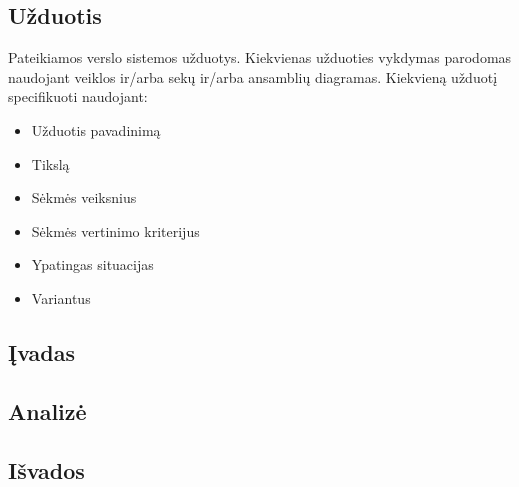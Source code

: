 \documentclass[10pt]{IEEEtran}
\begin{document}
        \subsection{Užduotis}

            Pateikiamos verslo sistemos užduotys. Kiekvienas užduoties vykdymas parodomas naudojant veiklos ir/arba sekų ir/arba ansamblių diagramas. Kiekvieną užduotį specifikuoti naudojant:

            \begin{itemize}
                \item Užduotis pavadinimą
                \item Tikslą
                \item Sėkmės veiksnius
                \item Sėkmės vertinimo kriterijus
                \item Ypatingas situacijas
                \item Variantus
            \end{itemize}

        \subsection{Įvadas}

        \subsection{Analizė}

        \subsection{Išvados}
\end{document}
